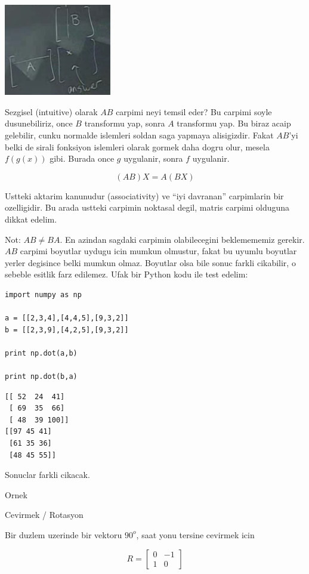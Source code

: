 \documentclass[12pt,fleqn]{article}\usepackage{../common}
\begin{document}
\includegraphics[height=4cm]{3_4.png}

Sezgisel (intuitive) olarak $AB$ carpimi neyi temsil eder? Bu carpimi soyle
dusunebiliriz, once $B$ transformu yap, sonra $A$ transformu yap. Bu biraz
acaip gelebilir, cunku normalde islemleri soldan saga yapmaya
alisigizdir. Fakat $AB$'yi belki de sirali fonksiyon islemleri olarak
gormek daha dogru olur, mesela $f(g(x))$ gibi. Burada once $g$ uygulanir,
sonra $f$ uygulanir. 

\[ (AB)X = A(BX) \]

Ustteki aktarim kanunudur (associativity) ve ``iyi davranan'' carpimlarin
bir ozelligidir. Bu arada ustteki carpimin noktasal degil, matris carpimi
olduguna dikkat edelim. 

Not: $AB \ne BA$. En azindan sagdaki carpimin olabilecegini beklemememiz
gerekir. $AB$ carpimi boyutlar uydugu icin mumkun olmustur, fakat bu uyumlu
boyutlar yerler degisince belki mumkun olmaz. Boyutlar olsa bile sonuc
farkli cikabilir, o sebeble esitlik farz edilemez. Ufak bir Python kodu ile
test edelim:

\begin{verbatim}
import numpy as np

a = [[2,3,4],[4,4,5],[9,3,2]]
b = [[2,3,9],[4,2,5],[9,3,2]]

print np.dot(a,b)

print np.dot(b,a)
\end{verbatim}

\begin{verbatim}
[[ 52  24  41]
 [ 69  35  66]
 [ 48  39 100]]
[[97 45 41]
 [61 35 36]
 [48 45 55]]
\end{verbatim}

Sonuclar farkli cikacak. 

Ornek

Cevirmek / Rotasyon

Bir duzlem uzerinde bir vektoru $90^o$, saat yonu tersine cevirmek icin 

\[ R =
\left[\begin{array}{rr}
0 & -1 \\
1 & 0
\end{array}\right]
 \]
\end{document}
